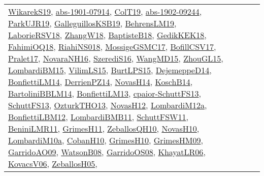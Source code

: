 {\begin{longtable}{lp{3cm}>{\raggedright}p{6cm}>{\raggedright}p{6cm}p{8cm}}
\href{articles/WikarekS19.pdf}{WikarekS19}\cite{WikarekS19}, \href{articles/abs-1901-07914.pdf}{abs-1901-07914}\cite{abs-1901-07914}, \href{papers/ColT19.pdf}{ColT19}\cite{ColT19}, \href{articles/abs-1902-09244.pdf}{abs-1902-09244}\cite{abs-1902-09244}, \href{papers/ParkUJR19.pdf}{ParkUJR19}\cite{ParkUJR19}, \href{papers/GalleguillosKSB19.pdf}{GalleguillosKSB19}\cite{GalleguillosKSB19}, \href{papers/BehrensLM19.pdf}{BehrensLM19}\cite{BehrensLM19}, \href{articles/LaborieRSV18.pdf}{LaborieRSV18}\cite{LaborieRSV18}, \href{articles/ZhangW18.pdf}{ZhangW18}\cite{ZhangW18}, \href{articles/BaptisteB18.pdf}{BaptisteB18}\cite{BaptisteB18}, \href{articles/GedikKEK18.pdf}{GedikKEK18}\cite{GedikKEK18}, \href{articles/FahimiOQ18.pdf}{FahimiOQ18}\cite{FahimiOQ18}, \href{papers/RiahiNS018.pdf}{RiahiNS018}\cite{RiahiNS018}, \href{papers/MossigeGSMC17.pdf}{MossigeGSMC17}\cite{MossigeGSMC17}, \href{papers/BofillCSV17.pdf}{BofillCSV17}\cite{BofillCSV17}, \href{papers/Pralet17.pdf}{Pralet17}\cite{Pralet17}, \href{articles/NovaraNH16.pdf}{NovaraNH16}\cite{NovaraNH16}, \href{papers/SzerediS16.pdf}{SzerediS16}\cite{SzerediS16}, \href{articles/WangMD15.pdf}{WangMD15}\cite{WangMD15}, \href{papers/ZhouGL15.pdf}{ZhouGL15}\cite{ZhouGL15}, \href{papers/LombardiBM15.pdf}{LombardiBM15}\cite{LombardiBM15}, \href{papers/VilimLS15.pdf}{VilimLS15}\cite{VilimLS15}, \href{papers/BurtLPS15.pdf}{BurtLPS15}\cite{BurtLPS15}, \href{papers/DejemeppeD14.pdf}{DejemeppeD14}\cite{DejemeppeD14}, \href{papers/BonfiettiLM14.pdf}{BonfiettiLM14}\cite{BonfiettiLM14}, \href{papers/DerrienPZ14.pdf}{DerrienPZ14}\cite{DerrienPZ14}, \href{articles/NovasH14.pdf}{NovasH14}\cite{NovasH14}, \href{papers/KoschB14.pdf}{KoschB14}\cite{KoschB14}, \href{papers/BartoliniBBLM14.pdf}{BartoliniBBLM14}\cite{BartoliniBBLM14}, \href{papers/BonfiettiLM13.pdf}{BonfiettiLM13}\cite{BonfiettiLM13}, \href{papers/cpaior-SchuttFS13.pdf}{cpaior-SchuttFS13}\cite{cpaior-SchuttFS13}, \href{papers/SchuttFS13.pdf}{SchuttFS13}\cite{SchuttFS13}, \href{articles/OzturkTHO13.pdf}{OzturkTHO13}\cite{OzturkTHO13}, \href{articles/NovasH12.pdf}{NovasH12}\cite{NovasH12}, \href{articles/LombardiM12a.pdf}{LombardiM12a}\cite{LombardiM12a}, \href{papers/BonfiettiLBM12.pdf}{BonfiettiLBM12}\cite{BonfiettiLBM12}, \href{papers/LombardiBMB11.pdf}{LombardiBMB11}\cite{LombardiBMB11}, \href{articles/SchuttFSW11.pdf}{SchuttFSW11}\cite{SchuttFSW11}, \href{articles/BeniniLMR11.pdf}{BeniniLMR11}\cite{BeniniLMR11}, \href{papers/GrimesH11.pdf}{GrimesH11}\cite{GrimesH11}, \href{articles/ZeballosQH10.pdf}{ZeballosQH10}\cite{ZeballosQH10}, \href{articles/NovasH10.pdf}{NovasH10}\cite{NovasH10}, \href{articles/LombardiM10a.pdf}{LombardiM10a}\cite{LombardiM10a}, \href{papers/CobanH10.pdf}{CobanH10}\cite{CobanH10}, \href{papers/GrimesH10.pdf}{GrimesH10}\cite{GrimesH10}, \href{papers/GrimesHM09.pdf}{GrimesHM09}\cite{GrimesHM09}, \href{articles/GarridoAO09.pdf}{GarridoAO09}\cite{GarridoAO09}, \href{papers/WatsonB08.pdf}{WatsonB08}\cite{WatsonB08}, \href{articles/GarridoOS08.pdf}{GarridoOS08}\cite{GarridoOS08}, \href{articles/KhayatLR06.pdf}{KhayatLR06}\cite{KhayatLR06}, \href{papers/KovacsV06.pdf}{KovacsV06}\cite{KovacsV06}, \href{articles/ZeballosH05.pdf}{ZeballosH05}\cite{ZeballosH05}, 
\end{longtable}}
